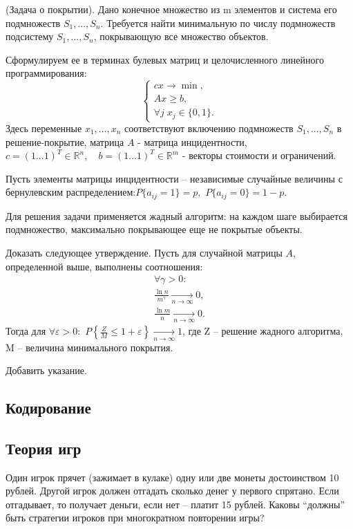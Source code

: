 \begin{problem}

(Задача о покрытии). Дано конечное множество из m элементов и система его подмножеств $S_{1} ,...,S_{n} $. Требуется найти минимальную по числу подмножеств подсистему $S_{1} ,...,S_{n} $, покрывающую все множество объектов. 

\noindent Сформулируем ее в терминах булевых матриц и целочисленного линейного программирования:
\[\left\{\begin{array}{l} {cx\to \min ,} \\ {Ax\ge b,} \\ {\forall j\; x_{j} \in \{ 0,1\} .} \end{array}\right. \] 
Здесь переменные $x_{1} ,...,x_{n} $ соответствуют включению подмножеств $S_{1} ,...,S_{n} $ в решение-покрытие, матрица $A$ - матрица инцидентности, $c=(1...1)^{T} \in {\mathbb R}^{n} ,\quad b=(1...1)^{T} \in {\mathbb R}^{m} $ - векторы стоимости и ограничений.

\noindent Пусть элементы матрицы инцидентности -- независимые случайные величины с бернулевским распределением:$P\{ a_{ij} =1\} =p,$ $P\{ a_{ij} =0\} =1-p$. 

\noindent Для решения задачи применяется жадный алгоритм: на каждом шаге выбирается подмножество, максимально покрывающее еще не покрытые объекты. 

Доказать следующее утверждение. Пусть для случайной матрицы $A$, определенной выше, выполнены соотношения:
\[\begin{array}{l} {\forall \gamma >0:} \\ {\frac{\ln n}{m^{\gamma } } \mathop{\to }\limits_{n\to \infty } 0,} \\ {\frac{\ln m}{n} \mathop{\to }\limits_{n\to \infty } 0.} \end{array}\] 
Тогда для $\forall \varepsilon >0:$ $P\left\{\frac{Z}{M} \le 1+\varepsilon \right\}\mathop{\to }\limits_{n\to \infty } 1$, где Z -- решение жадного алгоритма, M -- величина минимального покрытия. 

\begin{fixme}
Добавить указание.
\end{fixme}

\end{problem}




\subsection{Кодирование}
\subsection{Теория игр}
\begin{problem}
Один игрок прячет (зажимает в кулаке) одну или две монеты достоинством 10 рублей. Другой игрок должен отгадать сколько денег у первого спрятано. Если отгадывает, то получает деньги, если нет -- платит 15 рублей. Каковы ``должны'' быть стратегии игроков при многократном повторении игры?

\end{problem}